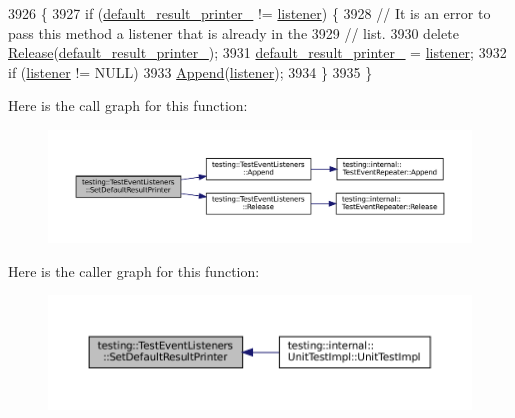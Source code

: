 \begin{DoxyCode}
3926                                                                             \{
3927   \textcolor{keywordflow}{if} (\hyperlink{classtesting_1_1TestEventListeners_a9ff9ebc31a9a52e5f108661cfcb7ecd9}{default\_result\_printer\_} != \hyperlink{namespaceinteractive__marker_a0e579ab555212bb5e2c9f8a675b7618a}{listener}) \{
3928     \textcolor{comment}{// It is an error to pass this method a listener that is already in the}
3929     \textcolor{comment}{// list.}
3930     \textcolor{keyword}{delete} \hyperlink{classtesting_1_1TestEventListeners_a038c9fa1975f84d6f3d25b52bc7bccdd}{Release}(\hyperlink{classtesting_1_1TestEventListeners_a9ff9ebc31a9a52e5f108661cfcb7ecd9}{default\_result\_printer\_});
3931     \hyperlink{classtesting_1_1TestEventListeners_a9ff9ebc31a9a52e5f108661cfcb7ecd9}{default\_result\_printer\_} = \hyperlink{namespaceinteractive__marker_a0e579ab555212bb5e2c9f8a675b7618a}{listener};
3932     \textcolor{keywordflow}{if} (\hyperlink{namespaceinteractive__marker_a0e579ab555212bb5e2c9f8a675b7618a}{listener} != NULL)
3933       \hyperlink{classtesting_1_1TestEventListeners_a1207dce74d64c1c39ffa6105560536a0}{Append}(\hyperlink{namespaceinteractive__marker_a0e579ab555212bb5e2c9f8a675b7618a}{listener});
3934   \}
3935 \}
\end{DoxyCode}
Here is the call graph for this function\+:
\nopagebreak
\begin{figure}[H]
\begin{center}
\leavevmode
\includegraphics[width=350pt]{classtesting_1_1TestEventListeners_aeaab55da7c18c35fb12c27c18ff99955_cgraph}
\end{center}
\end{figure}
Here is the caller graph for this function\+:
\nopagebreak
\begin{figure}[H]
\begin{center}
\leavevmode
\includegraphics[width=350pt]{classtesting_1_1TestEventListeners_aeaab55da7c18c35fb12c27c18ff99955_icgraph}
\end{center}
\end{figure}
\mbox{\label{classtesting_1_1TestEventListeners_a36dbac47563ef8bb78cb467d11f5b4d9}} 
